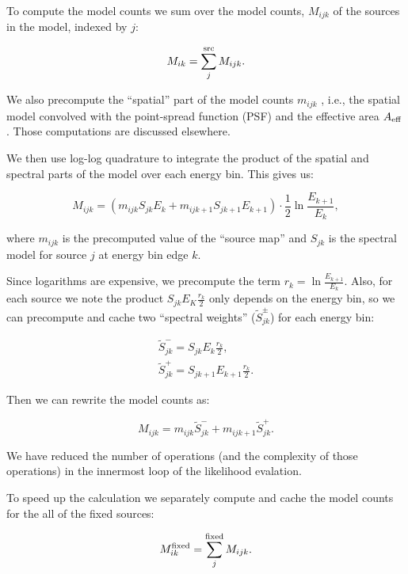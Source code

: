 \documentclass[preprint]{aastex}
\begin{document}
To compute the model counts we sum over the model counts, $M_{ijk}$ of
the sources in the model, indexed by $j$:

\begin{equation}
  M_{ik} =  \sum_j^{\rm src} M_{ijk}.
\end{equation}

\noindent We also precompute the ``spatial'' part of the model counts
$m_{ijk}$ , i.e., the spatial model convolved with the point-spread
function (PSF) and the effective area $A_{\rm eff}$.  Those
computations are discussed elsewhere.

We then use log-log quadrature to integrate the product of the spatial
and spectral parts of the model over each energy bin.  This gives us:

\begin{equation}
  M_{ijk} = (m_{ijk} S_{jk} E_k +  m_{ijk+1} S_{jk+1} E_{k+1}) \cdot \frac{1}{2} \ln\frac{E_{k+1}}{E_{k}},
\end{equation}

\noindent where $m_{ijk}$ is the precomputed value of the ``source
map'' and $S_{jk}$ is the spectral model for source $j$ at energy bin
edge $k$.

Since logarithms are expensive, we precompute the term $r_{k} = \ln\frac{E_{k+1}}{E_{k}}$. 
Also, for each source we note the product $S_{jk} E_K \frac{r_{k}}{2}$ only depends
on the energy bin, so we can precompute and cache two ``spectral weights'' ($\tilde{S}_{jk}^{\pm}$) 
for each energy bin:

\begin{eqnarray}
  \tilde{S}_{jk}^{-} = S_{jk} E_k \frac{r_{k}}{2}, \nonumber \\
  \tilde{S}_{jk}^{+} = S_{jk+1} E_{k+1} \frac{r_{k}}{2}. 
\end{eqnarray}

\noindent Then we can rewrite the model counts as:

\begin{equation}
  M_{ijk} = m_{ijk} \tilde{S}_{jk}^{-}  + m_{ijk+1} \tilde{S}_{jk}^{+}. 
\end{equation}

\noindent We have reduced the number of operations (and the complexity of those operations) in the innermost loop
of the likelihood evalation.  

To speed up the calculation we separately compute and cache
the model counts for the all of the fixed sources:

\begin{equation}
  M_{ik}^{\rm fixed} = \sum_j^{\rm fixed} M_{ijk}.
\end{equation}
\end{document}
